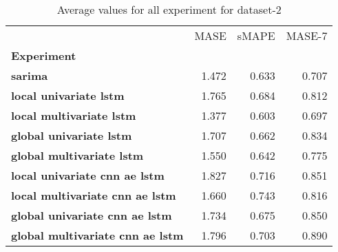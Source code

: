 \begin{table}[h]
\centering
\caption{Average values for all experiment for dataset-2}
\label{table:Average-metric-dataset-2}
\begin{tabular}{lrrr}
\toprule
{} &   MASE &  sMAPE &  MASE-7 \\
\textbf{Experiment                     } &        &        &         \\
\midrule
\textbf{sarima                         } &  1.472 &  0.633 &   0.707 \\
\textbf{local univariate lstm          } &  1.765 &  0.684 &   0.812 \\
\textbf{local multivariate lstm        } &  1.377 &  0.603 &   0.697 \\
\textbf{global univariate lstm         } &  1.707 &  0.662 &   0.834 \\
\textbf{global multivariate lstm       } &  1.550 &  0.642 &   0.775 \\
\textbf{local univariate cnn ae lstm   } &  1.827 &  0.716 &   0.851 \\
\textbf{local multivariate cnn ae lstm } &  1.660 &  0.743 &   0.816 \\
\textbf{global univariate cnn ae lstm  } &  1.734 &  0.675 &   0.850 \\
\textbf{global multivariate cnn ae lstm} &  1.796 &  0.703 &   0.890 \\
\bottomrule
\end{tabular}
\end{table}
